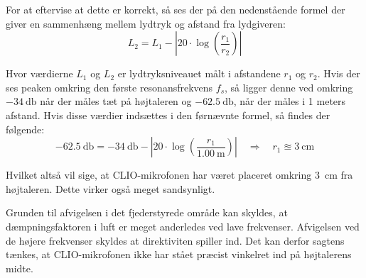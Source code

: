 For at eftervise at dette er korrekt, så ses der på den nedenstående formel der giver en sammenhæng mellem lydtryk og afstand fra lydgiveren:
\begin{equation}
	L_2 = L_1 - \left| 20 \cdot \log \left( \frac{r_1}{r_2} \right) \right|
\end{equation}

Hvor værdierne $L_1$ og $L_2$ er lydtryksniveauet målt i afstandene $r_1$ og $r_2$. Hvis der ses peaken omkring den første resonansfrekvens $f_s$, så ligger denne ved omkring $-\SI{34}{\decibel}$ når der måles tæt på højtaleren og $-\SI{62.5}{\decibel}$, når der måles i 1 meters afstand. Hvis disse værdier indsættes i den førnævnte formel, så findes der følgende:
\begin{equation}
	\SI{-62.5}{\decibel} = \SI{-34}{\decibel} - \left| 20 \cdot \log \left( \frac{r_1}{\SI{1.00}{\meter}} \right)\right| \quad \Rightarrow \quad r_1 \approxeq \SI{3}{\centi\meter}
\end{equation}

Hvilket altså vil sige, at CLIO-mikrofonen har været placeret omkring \SI{3}{\centi\meter} fra højtaleren. Dette virker også meget sandsynligt.

Grunden til afvigelsen i det fjederstyrede område kan skyldes, at dæmpningsfaktoren i luft er meget anderledes ved lave frekvenser. Afvigelsen ved de højere frekvenser skyldes at direktiviten spiller ind. Det kan derfor sagtens tænkes, at CLIO-mikrofonen ikke har stået præcist vinkelret ind på højtalerens midte.